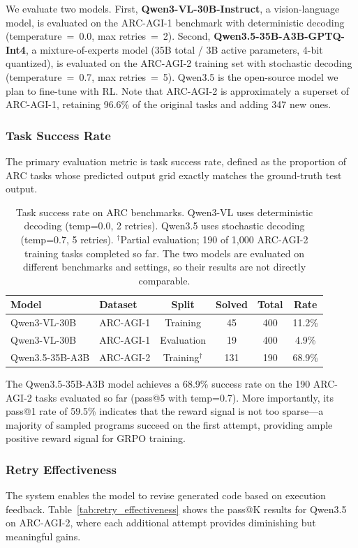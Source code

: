 \documentclass[11pt,letterpaper]{article}
\begin{document}
We evaluate two models. First, \textbf{Qwen3-VL-30B-Instruct}, a vision-language model, is evaluated on the ARC-AGI-1 benchmark with deterministic decoding (temperature~=~0.0, max retries~=~2). Second, \textbf{Qwen3.5-35B-A3B-GPTQ-Int4}, a mixture-of-experts model (35B total / 3B active parameters, 4-bit quantized), is evaluated on the ARC-AGI-2 training set with stochastic decoding (temperature~=~0.7, max retries~=~5). Qwen3.5 is the open-source model we plan to fine-tune with RL. Note that ARC-AGI-2 is approximately a superset of ARC-AGI-1, retaining 96.6\% of the original tasks and adding 347 new ones.

\subsubsection{Task Success Rate}
The primary evaluation metric is task success rate, defined as the proportion of ARC tasks whose predicted output grid exactly matches the ground-truth test output.

\begin{table}[h]
\centering
\begin{tabular}{llcccc}
\hline
\textbf{Model} & \textbf{Dataset} & \textbf{Split} & \textbf{Solved} & \textbf{Total} & \textbf{Rate} \\
\hline
Qwen3-VL-30B & ARC-AGI-1 & Training & 45 & 400 & 11.2\% \\
Qwen3-VL-30B & ARC-AGI-1 & Evaluation & 19 & 400 & 4.9\% \\
Qwen3.5-35B-A3B & ARC-AGI-2 & Training$^\dagger$ & 131 & 190 & 68.9\% \\
\hline
\end{tabular}
\caption{Task success rate on ARC benchmarks. Qwen3-VL uses deterministic decoding (temp=0.0, 2 retries). Qwen3.5 uses stochastic decoding (temp=0.7, 5 retries). $^\dagger$Partial evaluation; 190 of 1,000 ARC-AGI-2 training tasks completed so far. The two models are evaluated on different benchmarks and settings, so their results are not directly comparable.}
\label{tab:arc_baseline_results}
\end{table}

The Qwen3.5-35B-A3B model achieves a 68.9\% success rate on the 190 ARC-AGI-2 tasks evaluated so far (pass@5 with temp=0.7). More importantly, its pass@1 rate of 59.5\% indicates that the reward signal is not too sparse---a majority of sampled programs succeed on the first attempt, providing ample positive reward signal for GRPO training.

\subsubsection{Retry Effectiveness}
The system enables the model to revise generated code based on execution feedback. Table~\ref{tab:retry_effectiveness} shows the pass@K results for Qwen3.5 on ARC-AGI-2, where each additional attempt provides diminishing but meaningful gains.
\end{document}
